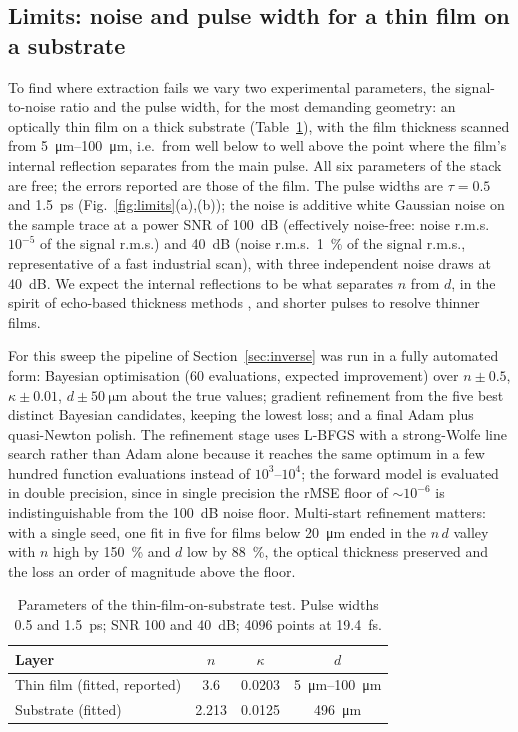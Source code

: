 \documentclass{optica-article}
\newcommand{\kap}{\kappa}
\begin{document}
\subsection{Limits: noise and pulse width for a thin film on a substrate}\label{sec:limits}
To find where extraction fails we vary two experimental parameters, the signal-to-noise ratio and the pulse width, for the most demanding geometry: an optically thin film on a thick substrate (Table~\ref{tab:thinfilm}), with the film thickness scanned from \SIrange{5}{100}{\micro\metre}, i.e.\ from well below to well above the point where the film's internal reflection separates from the main pulse. All six parameters of the stack are free; the errors reported are those of the film. The pulse widths are $\tau=0.5$ and \SI{1.5}{\pico\second} (Fig.~\ref{fig:limits}(a),(b)); the noise is additive white Gaussian noise on the sample trace at a power SNR of \SI{100}{dB} (effectively noise-free: noise r.m.s.\ $10^{-5}$ of the signal r.m.s.) and \SI{40}{dB} (noise r.m.s.\ \SI{1}{\percent} of the signal r.m.s., representative of a fast industrial scan), with three independent noise draws at \SI{40}{dB}. We expect the internal reflections to be what separates $n$ from $d$, in the spirit of echo-based thickness methods \cite{Duvillaret1999,Scheller2009,Yasui2005}, and shorter pulses to resolve thinner films.

For this sweep the pipeline of Section~\ref{sec:inverse} was run in a fully automated form: Bayesian optimisation (60 evaluations, expected improvement) over $n\pm0.5$, $\kap\pm0.01$, $d\pm\SI{50}{\micro\metre}$ about the true values; gradient refinement from the five best distinct Bayesian candidates, keeping the lowest loss; and a final Adam plus quasi-Newton polish. The refinement stage uses L-BFGS with a strong-Wolfe line search \cite{Nocedal2006} rather than Adam alone because it reaches the same optimum in a few hundred function evaluations instead of $10^{3}$--$10^{4}$; the forward model is evaluated in double precision, since in single precision the rMSE floor of $\sim10^{-6}$ is indistinguishable from the \SI{100}{dB} noise floor. Multi-start refinement matters: with a single seed, one fit in five for films below \SI{20}{\micro\metre} ended in the $n\,d$ valley with $n$ high by \SI{150}{\percent} and $d$ low by \SI{88}{\percent}, the optical thickness preserved and the loss an order of magnitude above the floor.

\begin{table}[htb]\centering\small
  \caption{Parameters of the thin-film-on-substrate test. Pulse widths 0.5 and \SI{1.5}{\pico\second}; SNR 100 and \SI{40}{dB}; \num{4096} points at \SI{19.4}{\femto\second}.}
  \label{tab:thinfilm}
  \begin{tabular}{lccc}\toprule
    Layer & $n$ & $\kap$ & $d$\\\midrule
    Thin film (fitted, reported) & 3.6 & 0.0203 & \SIrange{5}{100}{\micro\metre}\\
    Substrate (fitted) & 2.213 & 0.0125 & \SI{496}{\micro\metre}\\\bottomrule
  \end{tabular}
\end{table}
\end{document}

